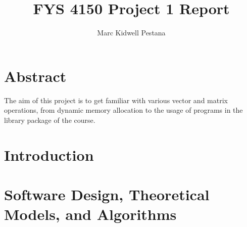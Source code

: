 \documentclass[11pt, oneside]{article}   	%
\title{FYS 4150 Project 1 Report}
\author{Marc Kidwell Pestana}
\date{}							%
\begin{document}
\maketitle
\section{Abstract}
The aim of this project is to get familiar with various vector and matrix operations, from dynamic memory allocation to the usage of programs in the library package of the course.
\section{Introduction}
\section{Software Design, Theoretical Models, and Algorithms}
\end{document}
